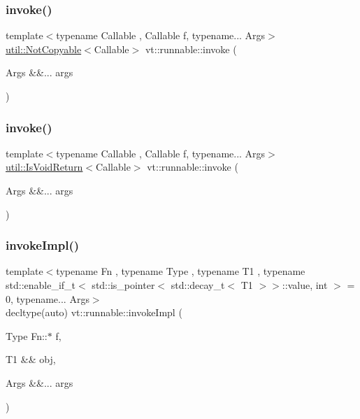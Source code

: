 \subsubsection{\texorpdfstring{invoke()}{invoke()}\hspace{0.1cm}{\footnotesize\ttfamily [2/3]}}
{\footnotesize\ttfamily template$<$typename Callable , Callable f, typename... Args$>$ \\
\hyperlink{namespacevt_1_1util_a0760a3963341a602dfe2dfc42d78c867}{util\+::\+Not\+Copyable}$<$Callable$>$ vt\+::runnable\+::invoke (\begin{DoxyParamCaption}\item[{Args \&\&...}]{args }\end{DoxyParamCaption})}

\mbox{\label{namespacevt_1_1runnable_ad7a4c11af0d8864939dca87f89fba1cb}} 
\subsubsection{\texorpdfstring{invoke()}{invoke()}\hspace{0.1cm}{\footnotesize\ttfamily [3/3]}}
{\footnotesize\ttfamily template$<$typename Callable , Callable f, typename... Args$>$ \\
\hyperlink{namespacevt_1_1util_a97df3e28837417537b3bc035c74f064d}{util\+::\+Is\+Void\+Return}$<$Callable$>$ vt\+::runnable\+::invoke (\begin{DoxyParamCaption}\item[{Args \&\&...}]{args }\end{DoxyParamCaption})}

\mbox{\label{namespacevt_1_1runnable_a4253e4fa9c8c6e68da420ab440f2b298}} 
\subsubsection{\texorpdfstring{invoke\+Impl()}{invokeImpl()}\hspace{0.1cm}{\footnotesize\ttfamily [1/2]}}
{\footnotesize\ttfamily template$<$typename Fn , typename Type , typename T1 , typename std\+::enable\+\_\+if\+\_\+t$<$ std\+::is\+\_\+pointer$<$ std\+::decay\+\_\+t$<$ T1 $>$$>$\+::value, int $>$  = 0, typename... Args$>$ \\
decltype(auto) vt\+::runnable\+::invoke\+Impl (\begin{DoxyParamCaption}\item[{Type Fn\+::$\ast$}]{f,  }\item[{T1 \&\&}]{obj,  }\item[{Args \&\&...}]{args }\end{DoxyParamCaption})}

